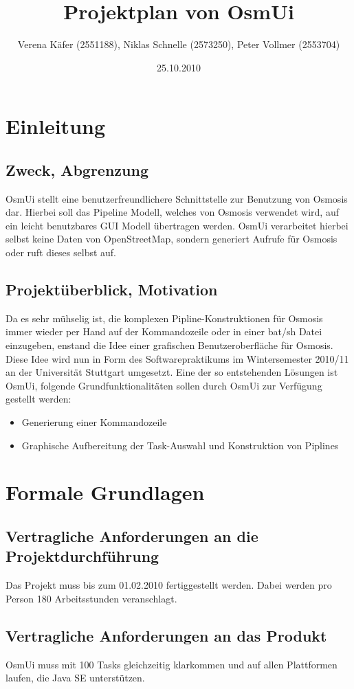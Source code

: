 \documentclass[a4paper,10pt]{scrartcl}
\author{Verena Käfer (2551188), Niklas Schnelle (2573250), Peter Vollmer (2553704)}
\date{25.10.2010}
\title{Projektplan von OsmUi}
\begin{document}
\maketitle
\newpage
\tableofcontents
\newpage


\section{Einleitung}
\subsection{Zweck, Abgrenzung}
OsmUi stellt eine benutzerfreundlichere Schnittstelle zur Benutzung von Osmosis dar. Hierbei soll das Pipeline Modell, welches von Osmosis verwendet wird, auf ein leicht benutzbares GUI Modell übertragen werden.
OsmUi verarbeitet hierbei selbst keine Daten von OpenStreetMap, sondern generiert Aufrufe für Osmosis oder ruft dieses
selbst auf. 
\subsection{Projektüberblick, Motivation}
Da es sehr mühselig ist, die komplexen Pipline-Konstruktionen für Osmosis immer wieder per Hand auf der Kommandozeile oder in einer bat/sh Datei einzugeben, 
enstand die Idee einer grafischen Benutzeroberfläche für Osmosis.
Diese Idee wird nun in Form des Softwarepraktikums im Wintersemester 2010/11 an der Universität Stuttgart umgesetzt.
Eine der so entstehenden Lösungen ist OsmUi, folgende Grundfunktionalitäten sollen durch OsmUi zur Verfügung gestellt werden:
\begin{itemize}
\item Generierung einer Kommandozeile
\item Graphische Aufbereitung der Task-Auswahl und Konstruktion von Piplines
\end{itemize}

\section{Formale Grundlagen}
\subsection{Vertragliche Anforderungen an die Projektdurchführung}
Das Projekt muss bis zum 01.02.2010 fertiggestellt werden. Dabei werden pro Person 180 Arbeitsstunden veranschlagt.
\subsection{Vertragliche Anforderungen an das Produkt}
OsmUi muss mit 100 Tasks gleichzeitig klarkommen und auf allen Plattformen laufen, die Java SE unterstützen. 
\end{document}
